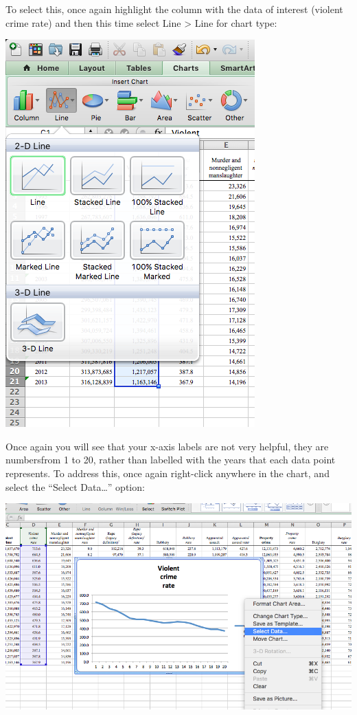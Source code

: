 \documentclass[
]{book}
\begin{document}
To select this, once again highlight the column with the data of interest (violent crime rate) and then this time select Line \textgreater{} Line for chart type:

\includegraphics{imgs/desc_line_1.png}

Once again you will see that your x-axis labels are not very helpful, they are numbersfrom 1 to 20, rather than labelled with the years that each data point represents. To address this, once again right-click anywhere in the chart, and select the ``Select Data\ldots{}'' option:

\includegraphics{imgs/desc_line_2.png}
\end{document}
